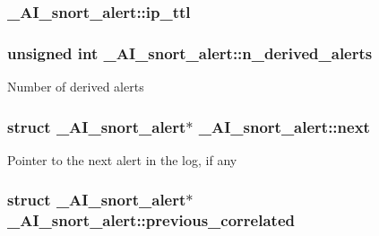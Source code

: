 \label{struct__AI__snort__alert_a3f3c47f9baf3229d067504a85873b416}
\hypertarget{struct__AI__snort__alert_a3c9bbe84ec696cd58668a45799a66600}{
\subsubsection[{ip\_\-ttl}]{ {\bf \_\-AI\_\-snort\_\-alert::ip\_\-ttl}}}
\label{struct__AI__snort__alert_a3c9bbe84ec696cd58668a45799a66600}
\hypertarget{struct__AI__snort__alert_a1f2d5e8cfd0e6321b977173d1e90cb68}{
\subsubsection[{n\_\-derived\_\-alerts}]{\setlength{\rightskip}{0pt plus 5cm}unsigned int {\bf \_\-AI\_\-snort\_\-alert::n\_\-derived\_\-alerts}}}
\label{struct__AI__snort__alert_a1f2d5e8cfd0e6321b977173d1e90cb68}
Number of derived alerts \hypertarget{struct__AI__snort__alert_aa8336d4b3359015ed8ea312ca1fd1173}{
\subsubsection[{next}]{\setlength{\rightskip}{0pt plus 5cm}struct {\bf \_\-AI\_\-snort\_\-alert}$\ast$ {\bf \_\-AI\_\-snort\_\-alert::next}}}
\label{struct__AI__snort__alert_aa8336d4b3359015ed8ea312ca1fd1173}
Pointer to the next alert in the log, if any \hypertarget{struct__AI__snort__alert_a55a5488c7ee7706ded4c16b1235fd9c7}{
\subsubsection[{previous\_\-correlated}]{\setlength{\rightskip}{0pt plus 5cm}struct {\bf \_\-AI\_\-snort\_\-alert}$\ast$ {\bf \_\-AI\_\-snort\_\-alert::previous\_\-correlated}}}
\label{struct__AI__snort__alert_a55a5488c7ee7706ded4c16b1235fd9c7}
